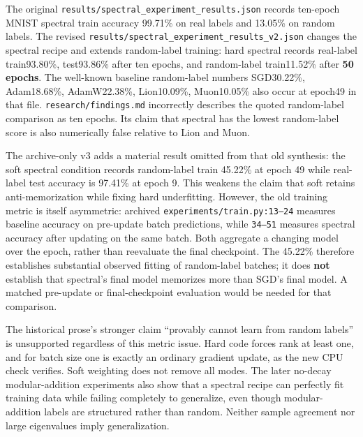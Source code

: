 \documentclass[
  british,
  10pt,
  a4paper,
]{article}
\begin{document}
The original
\texttt{results/\allowbreak{}spectral\_\allowbreak{}experiment\_\allowbreak{}results.\allowbreak{}json}
records ten-epoch MNIST spectral train accuracy 99.71\% on real labels
and 13.05\% on random labels. The revised
\texttt{results/\allowbreak{}spectral\_\allowbreak{}experiment\_\allowbreak{}results\_\allowbreak{}v2.\allowbreak{}json}
changes the spectral recipe and extends random-\allowbreak{}label
training: hard spectral records real-label
train93.\allowbreak{}80\%,\allowbreak{} test93.86\% after ten epochs,
and random-\allowbreak{}label train11.\allowbreak{}52\% after \textbf{50
epochs}. The well-known baseline random-\allowbreak{}label numbers
SGD30.22\%, Adam18.\allowbreak{}68\%,\allowbreak{}
AdamW22.\allowbreak{}38\%,\allowbreak{}
Lion10.\allowbreak{}09\%,\allowbreak{} Muon10.05\% also occur at epoch49
in that file. \texttt{research/\allowbreak{}findings.\allowbreak{}md}
incorrectly describes the quoted random-\allowbreak{}label comparison as
ten epochs. Its claim that spectral has the lowest
random-\allowbreak{}label score is also numerically false relative to
Lion and Muon.

The archive-\allowbreak{}only v3 adds a material result omitted from
that old synthesis: the soft spectral condition records
random-\allowbreak{}label train 45.22\% at epoch 49 while real-label
test accuracy is 97.41\% at epoch 9. This weakens the claim that soft
retains anti-\allowbreak{}memorization\allowbreak{} while fixing hard
underfitting\allowbreak{}.\allowbreak{} However, the old training metric
is itself asymmetric: archived
\texttt{experiments/\allowbreak{}train.\allowbreak{}py:\allowbreak{}13–24}
measures baseline accuracy on pre-update batch predictions,\allowbreak{}
while \texttt{34–51} measures spectral accuracy after updating on the
same batch. Both aggregate a changing model over the epoch, rather than
reevaluate the final checkpoint.\allowbreak{} The 45.22\% therefore
establishes substantial observed fitting of random-\allowbreak{}label
batches; it does \textbf{not} establish that spectral's final model
memorizes more than SGD's final model. A matched pre-update or
final-\allowbreak{}checkpoint evaluation would be needed for that
comparison.\allowbreak{}

The historical prose's stronger claim ``provably cannot learn from
random labels'' is unsupported regardless of this metric issue. Hard
code forces rank at least one, and for batch size one is exactly an
ordinary gradient update, as the new CPU check verifies. Soft weighting
does not remove all modes. The later no-decay
modular-\allowbreak{}addition experiments also show that a spectral
recipe can perfectly fit training data while failing completely to
generalize,\allowbreak{} even though modular-\allowbreak{}addition
labels are structured rather than random. Neither sample agreement nor
large eigenvalues imply generalizati\allowbreak{}on.\allowbreak{}
\end{document}
